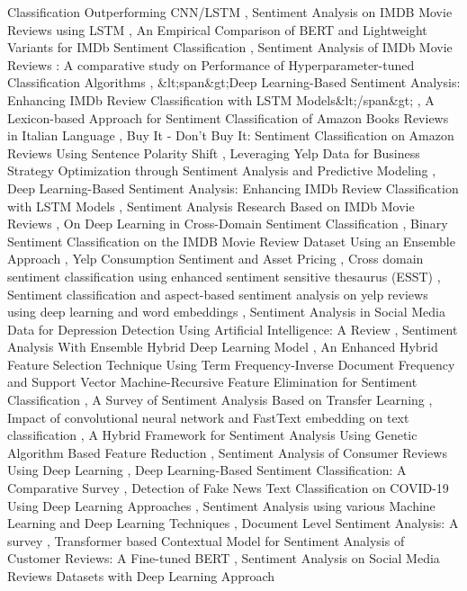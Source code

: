 \documentclass{article}
\begin{document}
Classification Outperforming CNN/LSTM \cite{yuan2026empirical5a975446}, Sentiment Analysis on IMDB Movie Reviews using LSTM \cite{choudhary2025sentimenta52cc157}, An Empirical Comparison of BERT and Lightweight Variants for IMDb Sentiment Classification \cite{wu2026empirical56d5f7df}, Sentiment Analysis of IMDb Movie Reviews : A comparative study on Performance of Hyperparameter-tuned Classification Algorithms \cite{ghosh2022sentiment2060df3c}, \&lt;span\&gt;Deep Learning-Based Sentiment Analysis: Enhancing IMDb Review Classification with LSTM Models\&lt;/span\&gt; \cite{kalla2025spanc8735c67}, A Lexicon-based Approach for Sentiment Classification of Amazon Books Reviews in Italian Language \cite{chiavetta2016lexiconbased0860c873}, Buy It - Don’t Buy It: Sentiment Classification on Amazon Reviews Using Sentence Polarity Shift \cite{orimaye2012buyd50ada57}, Leveraging Yelp Data for Business Strategy Optimization through Sentiment Analysis and Predictive Modeling \cite{korada2025leveraging6ec8db92}, Deep Learning-Based Sentiment Analysis: Enhancing IMDb Review Classification with LSTM Models \cite{varadharajan2025deep223eb57d}, Sentiment Analysis Research Based on IMDb Movie Reviews \cite{x2026sentiment260218c3}, On Deep Learning in Cross-Domain Sentiment Classification \cite{domeniconi2017deep593e4546}, Binary Sentiment Classification on the IMDB Movie Review Dataset Using an Ensemble Approach \cite{dongre2025binary665b372b}, Yelp Consumption Sentiment and Asset Pricing \cite{jacoby2024yelpa2b73b30}, Cross domain sentiment classification using enhanced sentiment sensitive thesaurus (ESST) \cite{sanju2013cross26b4ce16}, Sentiment classification and aspect-based sentiment analysis on yelp reviews using deep learning and word embeddings \cite{alamoudi2021sentiment4d4dddd6}, Sentiment Analysis in Social Media Data for Depression Detection Using Artificial Intelligence: A Review \cite{babu2021sentiment5b478c38}, Sentiment Analysis With Ensemble Hybrid Deep Learning Model \cite{tan2022sentiment4832d81e}, An Enhanced Hybrid Feature Selection Technique Using Term Frequency-Inverse Document Frequency and Support Vector Machine-Recursive Feature Elimination for Sentiment Classification \cite{nafis2021enhanced8d424bec}, A Survey of Sentiment Analysis Based on Transfer Learning \cite{liu2019survey6f8551f6}, Impact of convolutional neural network and FastText embedding on text classification \cite{umer2022impact43feb507}, A Hybrid Framework for Sentiment Analysis Using Genetic Algorithm Based Feature Reduction \cite{iqbal2019hybridf5ede317}, Sentiment Analysis of Consumer Reviews Using Deep Learning \cite{iqbal2022sentimentd18b9ffb}, Deep Learning-Based Sentiment Classification: A Comparative Survey \cite{mabrouk2020deepe59e339e}, Detection of Fake News Text Classification on COVID-19 Using Deep Learning Approaches \cite{bangyal2021detection2da80cf9}, Sentiment Analysis using various Machine Learning and Deep Learning Techniques \cite{umarani2021sentiment5263777e}, Document Level Sentiment Analysis: A survey \cite{behdenna2018document0f28a934}, Transformer based Contextual Model for Sentiment Analysis of Customer Reviews: A Fine-tuned BERT \cite{durairaj2021transformer24fb64c1}, Sentiment Analysis on Social Media Reviews Datasets with Deep Learning Approach 
\end{document}
